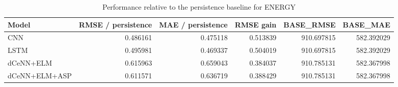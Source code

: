 \begin{table}
\caption{Performance relative to the persistence baseline for ENERGY}
\begin{tabular}{lrrrrr}
\toprule
Model & RMSE / persistence & MAE / persistence & RMSE gain & BASE\_RMSE & BASE\_MAE \\
\midrule
CNN & 0.486161 & 0.475118 & 0.513839 & 910.697815 & 582.392029 \\
LSTM & 0.495981 & 0.469337 & 0.504019 & 910.697815 & 582.392029 \\
dCeNN+ELM & 0.615963 & 0.659043 & 0.384037 & 910.785131 & 582.367998 \\
dCeNN+ELM+ASP & 0.611571 & 0.636719 & 0.388429 & 910.785131 & 582.367998 \\
\bottomrule
\end{tabular}
\end{table}
